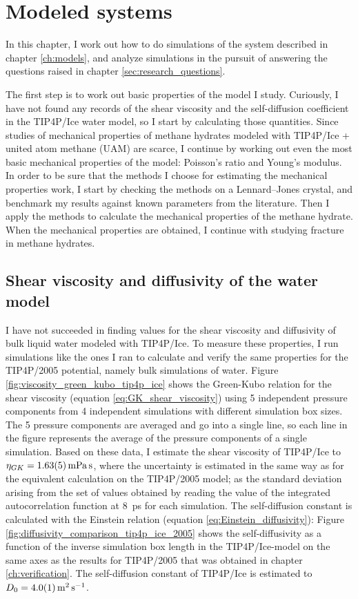 
\chapter{Modeled systems}
\label{ch:modeledsystems}
In this chapter, I work out how to do simulations of the system described in chapter \ref{ch:models}, and analyze simulations in the pursuit of answering the questions raised in chapter \ref{sec:research_questions}.

The first step is to work out basic properties of the model I study. Curiously, I have not found any records of the shear viscosity and the self-diffusion coefficient in the TIP4P/Ice water model, so I start by calculating those quantities. Since studies of mechanical properties of methane hydrates modeled with TIP4P/Ice + united atom methane (UAM) are scarce, I continue by working out even the most basic mechanical properties of the model: Poisson's ratio and Young's modulus. In order to be sure that the methods I choose for estimating the mechanical properties work, I start by checking the methods on a Lennard--Jones crystal, and benchmark my results against known parameters from the literature. Then I apply the methods to calculate the mechanical properties of the methane hydrate. When the mechanical properties are obtained, I continue with studying fracture in methane hydrates.

\section{Shear viscosity and diffusivity of the water model}
I have not succeeded in finding values for the shear viscosity and diffusivity of bulk liquid water modeled with TIP4P/Ice. To measure these properties, I run simulations like the ones I ran to calculate and verify the same properties for the TIP4P/2005 potential, namely bulk simulations of water. Figure \ref{fig:viscosity_green_kubo_tip4p_ice} shows the Green-Kubo relation for the shear viscosity (equation \ref{eq:GK_shear_viscosity}) using 5 independent pressure components from 4 independent simulations with different simulation box sizes. The 5 pressure components are averaged and go into a single line, so each line in the figure represents the average of the pressure components of a single simulation. Based on these data, I estimate the shear viscosity of TIP4P/Ice to $\eta_{GK} = \text{\SI{1.63\pm 0.05}{\milli\pascal\second}}$, where the uncertainty is estimated in the same way as for the equivalent calculation on the TIP4P/2005 model; as the standard deviation arising from the set of values obtained by reading the value of the integrated autocorrelation function at \SI{8}{\pico\second} for each simulation. The self-diffusion constant is calculated with the Einstein relation (equation \ref{eq:Einstein_diffusivity}): Figure \ref{fig:diffusivity_comparison_tip4p_ice_2005} shows the self-diffusivity as a function of the inverse simulation box length in the TIP4P/Ice-model on the same axes as the results for TIP4P/2005 that was obtained in chapter \ref{ch:verification}. The self-diffusion constant of TIP4P/Ice is estimated to $D_0 = \SI{4.0 \pm 0.1}{\meter\squared\per\second}$.

